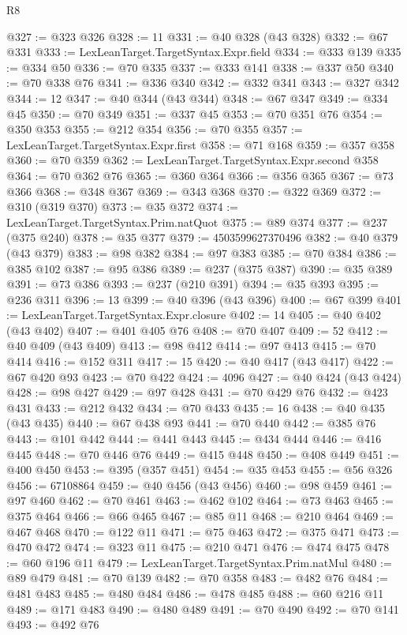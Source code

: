 \begin{lexlean}{R8}
\begin{coremodule}
@327 := @323 @326
@328 := 11
@331 := @40 @328 (@43 @328)
@332 := @67 @331
@333 := LexLeanTarget.TargetSyntax.Expr.field
@334 := @333 @139
@335 := @334 @50
@336 := @70 @335
@337 := @333 @141
@338 := @337 @50
@340 := @70 @338 @76
@341 := @336 @340
@342 := @332 @341
@343 := @327 @342
@344 := 12
@347 := @40 @344 (@43 @344)
@348 := @67 @347
@349 := @334 @45
@350 := @70 @349
@351 := @337 @45
@353 := @70 @351 @76
@354 := @350 @353
@355 := @212 @354
@356 := @70 @355
@357 := LexLeanTarget.TargetSyntax.Expr.first
@358 := @71 @168
@359 := @357 @358
@360 := @70 @359
@362 := LexLeanTarget.TargetSyntax.Expr.second @358
@364 := @70 @362 @76
@365 := @360 @364
@366 := @356 @365
@367 := @73 @366
@368 := @348 @367
@369 := @343 @368
@370 := @322 @369
@372 := @310 (@319 @370)
@373 := @35 @372
@374 := LexLeanTarget.TargetSyntax.Prim.natQuot
@375 := @89 @374
@377 := @237 (@375 @240)
@378 := @35 @377
@379 := 4503599627370496
@382 := @40 @379 (@43 @379)
@383 := @98 @382
@384 := @97 @383
@385 := @70 @384
@386 := @385 @102
@387 := @95 @386
@389 := @237 (@375 @387)
@390 := @35 @389
@391 := @73 @386
@393 := @237 (@210 @391)
@394 := @35 @393
@395 := @236 @311
@396 := 13
@399 := @40 @396 (@43 @396)
@400 := @67 @399
@401 := LexLeanTarget.TargetSyntax.Expr.closure
@402 := 14
@405 := @40 @402 (@43 @402)
@407 := @401 @405 @76
@408 := @70 @407
@409 := 52
@412 := @40 @409 (@43 @409)
@413 := @98 @412
@414 := @97 @413
@415 := @70 @414
@416 := @152 @311
@417 := 15
@420 := @40 @417 (@43 @417)
@422 := @67 @420 @93
@423 := @70 @422
@424 := 4096
@427 := @40 @424 (@43 @424)
@428 := @98 @427
@429 := @97 @428
@431 := @70 @429 @76
@432 := @423 @431
@433 := @212 @432
@434 := @70 @433
@435 := 16
@438 := @40 @435 (@43 @435)
@440 := @67 @438 @93
@441 := @70 @440
@442 := @385 @76
@443 := @101 @442
@444 := @441 @443
@445 := @434 @444
@446 := @416 @445
@448 := @70 @446 @76
@449 := @415 @448
@450 := @408 @449
@451 := @400 @450
@453 := @395 (@357 @451)
@454 := @35 @453
@455 := @56 @326
@456 := 67108864
@459 := @40 @456 (@43 @456)
@460 := @98 @459
@461 := @97 @460
@462 := @70 @461
@463 := @462 @102
@464 := @73 @463
@465 := @375 @464
@466 := @66 @465
@467 := @85 @11
@468 := @210 @464
@469 := @467 @468
@470 := @122 @11
@471 := @75 @463
@472 := @375 @471
@473 := @470 @472
@474 := @323 @11
@475 := @210 @471
@476 := @474 @475
@478 := @60 @196 @11
@479 := LexLeanTarget.TargetSyntax.Prim.natMul
@480 := @89 @479
@481 := @70 @139
@482 := @70 @358
@483 := @482 @76
@484 := @481 @483
@485 := @480 @484
@486 := @478 @485
@488 := @60 @216 @11
@489 := @171 @483
@490 := @480 @489
@491 := @70 @490
@492 := @70 @141
@493 := @492 @76

\end{coremodule}
\end{lexlean}
